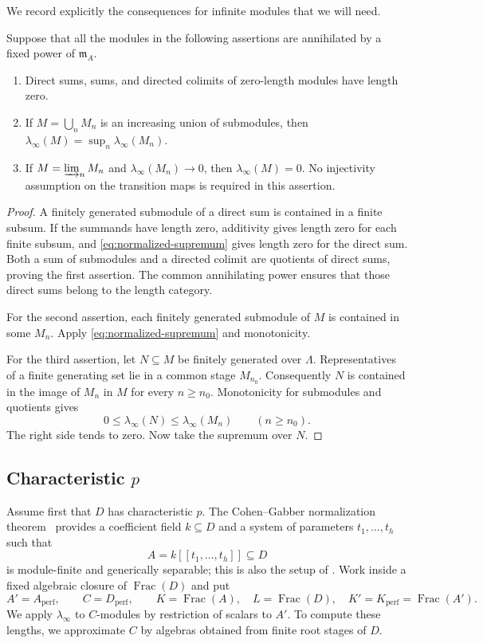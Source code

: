 We record explicitly the consequences for infinite modules that we
will need.

\begin{lemma}\label{lem:normalized-limit}
Suppose that all the modules in the following assertions are
annihilated by a fixed power of $\mathfrak m_A$.
\begin{enumerate}
\item Direct sums, sums, and directed colimits of zero-length modules
have length zero.
\item If $M=\bigcup_n M_n$ is an increasing union of submodules, then
$\lambda_\infty(M)=\sup_n\lambda_\infty(M_n)$.
\item If $M=\varinjlim_n M_n$ and
$\lambda_\infty(M_n)\longrightarrow 0$, then
$\lambda_\infty(M)=0$.  No injectivity assumption on the transition maps
is required in this assertion.
\end{enumerate}
\end{lemma}

\begin{proof}
A finitely generated submodule of a direct sum is contained in a
finite subsum.  If the summands have length zero, additivity gives
length zero for each finite subsum, and
\eqref{eq:normalized-supremum} gives length zero for the direct sum.
Both a sum of submodules and a directed colimit are quotients of
direct sums, proving the first assertion.  The common annihilating
power ensures that those direct sums belong to the length category.

For the second assertion, each finitely generated submodule of $M$ is
contained in some $M_n$.  Apply \eqref{eq:normalized-supremum} and
monotonicity.

For the third assertion, let $N\subseteq M$ be finitely generated over
$\Lambda$.  Representatives of a finite generating set lie in a common
stage $M_{n_0}$.  Consequently $N$ is contained in the image of $M_n$
in $M$ for every $n\geq n_0$.  Monotonicity for submodules and quotients
gives
\[
 0\leq\lambda_\infty(N)\leq\lambda_\infty(M_n)
       \qquad(n\geq n_0).
\]
The right side tends to zero.  Now take the supremum over $N$.
\end{proof}

\subsection{Characteristic \texorpdfstring{$p$}{p}}

Assume first that $D$ has characteristic $p$.  The Cohen--Gabber
normalization theorem~\cite[Theorem~1.1]{KuranoShimomoto} provides
a coefficient field $k\subseteq D$ and
a system of parameters $t_1,\ldots,t_h$ such that
\[
 A=k[[t_1,\ldots,t_h]]\subseteq D
\]
is module-finite and generically separable; this is also the setup of
\cite[Section~3]{CLMST}.  Work inside a fixed algebraic closure of
$\operatorname{Frac}(D)$ and put
\[
 A'=A_{\mathrm{perf}},\qquad C=D_{\mathrm{perf}},\qquad
 K=\operatorname{Frac}(A),\quad L=\operatorname{Frac}(D),\quad
 K'=K_{\mathrm{perf}}=\operatorname{Frac}(A').
\]
We apply $\lambda_\infty$ to $C$-modules by restriction of scalars to
$A'$.  To compute these lengths, we approximate $C$ by algebras
obtained from finite root stages of $D$.


